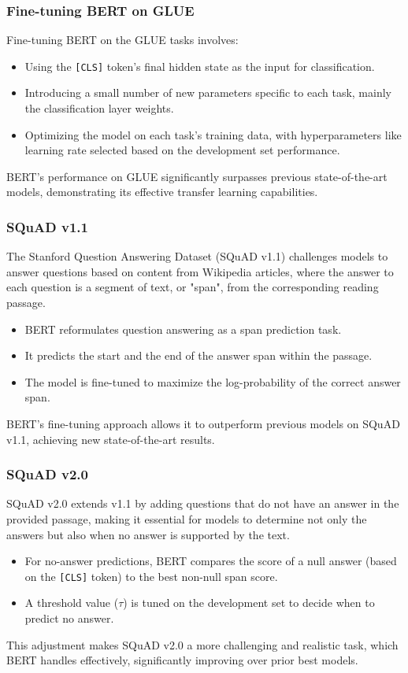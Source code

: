 \documentclass[11pt,xcolor={dvipsnames},hyperref={pdftex,pdfpagemode=UseNone,hidelinks,pdfdisplaydoctitle=true},usepdftitle=false]{beamer}
\begin{document}
\begin{frame}
\frametitle{Fine-tuning BERT on GLUE}
Fine-tuning BERT on the GLUE tasks involves:
\begin{itemize}
    \item Using the {\tt [CLS]} token's final hidden state as the input for classification.
    \item Introducing a small number of new parameters specific to each task, mainly the classification layer weights.
    \item Optimizing the model on each task's training data, with hyperparameters like learning rate selected based on the development set performance.
\end{itemize}
BERT's performance on GLUE significantly surpasses previous state-of-the-art models, demonstrating its effective transfer learning capabilities.
\end{frame}

\begin{frame}
\frametitle{SQuAD v1.1}
The Stanford Question Answering Dataset (SQuAD v1.1) challenges models to answer questions based on content from Wikipedia articles, where the answer to each question is a segment of text, or "span", from the corresponding reading passage.
\begin{itemize}
    \item BERT reformulates question answering as a span prediction task.
    \item It predicts the start and the end of the answer span within the passage.
    \item The model is fine-tuned to maximize the log-probability of the correct answer span.
\end{itemize}
BERT's fine-tuning approach allows it to outperform previous models on SQuAD v1.1, achieving new state-of-the-art results.
\end{frame}

\begin{frame}
\frametitle{SQuAD v2.0}
SQuAD v2.0 extends v1.1 by adding questions that do not have an answer in the provided passage, making it essential for models to determine not only the answers but also when no answer is supported by the text.
\begin{itemize}
    \item For no-answer predictions, BERT compares the score of a null answer (based on the {\tt [CLS]} token) to the best non-null span score.
    \item A threshold value ($\tau$) is tuned on the development set to decide when to predict no answer.
\end{itemize}
This adjustment makes SQuAD v2.0 a more challenging and realistic task, which BERT handles effectively, significantly improving over prior best models.
\end{frame}
\end{document}
